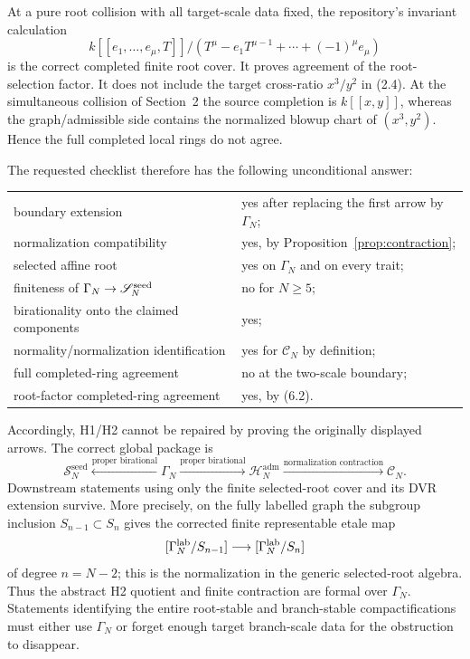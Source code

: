 \documentclass[11pt]{article}
\begin{document}
At a pure root collision with all target-scale data fixed, the repository's
invariant calculation
\[
 k[[e_1,\ldots,e_\mu,T]]/
 (T^\mu-e_1T^{\mu-1}+\cdots+(-1)^\mu e_\mu)          \tag{6.2}
\]
is the correct completed finite root cover.  It proves agreement of the
root-selection factor.  It does not include the target cross-ratio
$x^3/y^2$ in (2.4).  At the simultaneous collision of Section~2 the source
completion is $k[[x,y]]$, whereas the graph/admissible side contains the
normalized blowup chart of $(x^3,y^2)$.  Hence the full completed local rings
do not agree.

The requested checklist therefore has the following unconditional answer:
\begin{center}
\begin{tabular}{ll}
boundary extension & yes after replacing the first arrow by $\Gamma_N$;\\
normalization compatibility & yes, by Proposition~\ref{prop:contraction};\\
selected affine root & yes on $\Gamma_N$ and on every trait;\\
finiteness of $\Gamma_N\to\mathscr S_N^{\rm seed}$ & no for $N\ge5$;\\
birationality onto the claimed components & yes;\\
normality/normalization identification & yes for $\mathcal C_N$ by definition;\\
full completed-ring agreement & no at the two-scale boundary;\\
root-factor completed-ring agreement & yes, by (6.2).
\end{tabular}
\end{center}

Accordingly, H1/H2 cannot be repaired by proving the originally displayed
arrows.  The correct global package is
\[
 \boxed{
 \mathscr S_N^{\mathrm{seed}}
 \xleftarrow{\text{proper birational}}
 \Gamma_N
 \xrightarrow{\text{proper birational}}
 \mathscr H_N^{\mathrm{adm}}
 \xrightarrow{\text{normalization contraction}}
 \mathcal C_N .}
\]
Downstream statements using only the finite selected-root cover and its DVR
extension survive.  More precisely, on the fully labelled graph the subgroup
inclusion $S_{n-1}\subset S_n$ gives the corrected finite representable
etale map
\[
 [\Gamma_N^{\rm lab}/S_{n-1}]
   \longrightarrow
 [\Gamma_N^{\rm lab}/S_n]
\]
of degree $n=N-2$; this is the normalization in the generic selected-root
algebra.  Thus the abstract H2 quotient and finite contraction are formal
over $\Gamma_N$.  Statements identifying the entire root-stable and
branch-stable compactifications must either use $\Gamma_N$ or forget enough
target branch-scale data for the obstruction to disappear.
\end{document}
